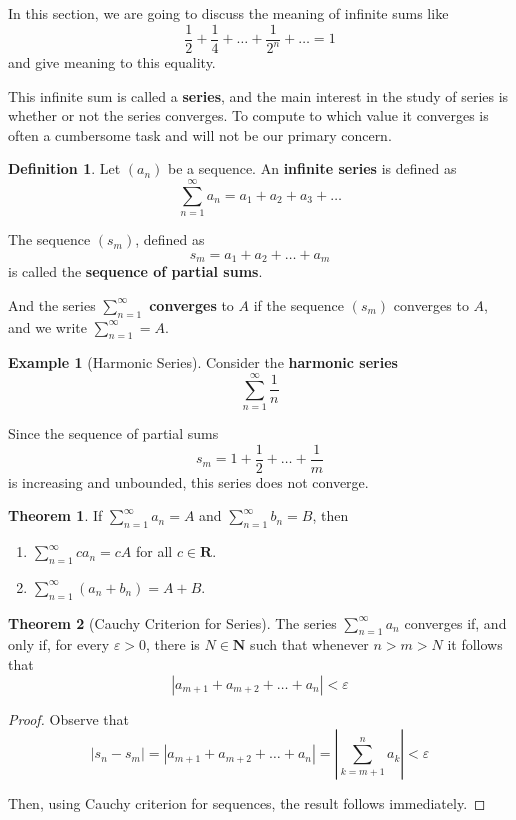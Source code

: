 \documentclass[tikz,12pt,a4paper]{article}
\theoremstyle{definition}
\newtheorem{theorem}{Theorem}[section]
\newtheorem{example}{Example}[section]
\newtheorem{definition}{Definition}[section]
\begin{document}
In this section, we are going to discuss the meaning of infinite sums like
\[
	\frac{1}{2} + \frac{1}{4} + \ldots + \frac{1}{2^n} + \ldots = 1
\]
and give meaning to this equality.

This infinite sum is called a \textbf{series}, and the main interest in the study of series is whether or not the series converges. To compute to which value it converges is often a cumbersome task and will not be our primary concern.

\begin{definition}
	Let $(a_n)$ be a sequence. An \textbf{infinite series} is defined as
	\[
		\sum_{n=1}^\infty a_n = a_1 + a_2 + a_3 + \ldots
	\]
	
	The sequence $(s_m)$, defined as
	\[
		s_m = a_1 + a_2 + \ldots + a_m
	\]
	is called the \textbf{sequence of partial sums}.
	
	And the series $\sum_{n=1}^\infty$ \textbf{converges} to $A$ if the sequence $(s_m)$ converges to $A$, and we write $\sum_{n=1}^\infty = A$.
\end{definition}

\begin{example}[Harmonic Series]
	Consider the \textbf{harmonic series}
	\[
		\sum_{n=1}^\infty \frac{1}{n}
	\]
	
	Since the sequence of partial sums
	\[
		s_m = 1 + \frac{1}{2} + \ldots + \frac{1}{m}
	\]
	is increasing and unbounded, this series does not converge. 
\end{example}

\begin{theorem}
	If $\sum_{n=1}^\infty a_n = A$ and $\sum_{n=1}^\infty b_n = B$, then
	\begin{enumerate}
		\item $\sum_{n=1}^\infty c a_n = cA$ for all $c \in \textbf{R}$.
		\item $\sum_{n=1}^\infty (a_n + b_n) = A + B$.
	\end{enumerate}
\end{theorem}

\begin{theorem}[Cauchy Criterion for Series]
	The series $\sum_{n=1}^\infty a_n$ converges if, and only if, for every $\varepsilon > 0$, there is $N \in \textbf{N}$ such that whenever $n > m > N$ it follows that
	\[
		| a_{m+1} + a_{m+2} + \ldots + a_n | < \varepsilon
	\]
\end{theorem}

\begin{proof}
	Observe that
	\[
		| s_n - s_m | = | a_{m+1} + a_{m+2} + \ldots + a_n | = \left| \sum_{k=m+1}^n a_k \right| < \varepsilon
	\]
	
	Then, using Cauchy criterion for sequences, the result follows immediately. 
\end{proof}
\end{document}
